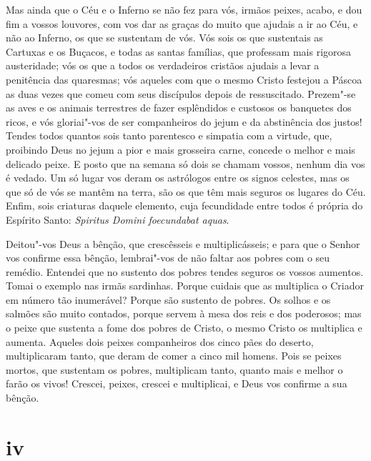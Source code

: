 Mas ainda que o Céu e o Inferno se não fez para vós, irmãos peixes,
acabo, e dou fim a vossos louvores, com vos dar as graças do muito que
ajudais a ir ao Céu, e não ao Inferno, os que se sustentam de vós. Vós
sois os que sustentais as Cartuxas e os Buçacos, e todas as santas
famílias, que professam mais rigorosa austeridade; vós os que a todos os
verdadeiros cristãos ajudais a levar a penitência das quaresmas; vós
aqueles com que o mesmo Cristo festejou a Páscoa as duas vezes que comeu
com seus discípulos depois de ressuscitado. Prezem"-se as aves e os
animais terrestres de fazer esplêndidos e custosos os banquetes dos
ricos, e vós gloriai"-vos de ser companheiros do jejum e da abstinência
dos justos! Tendes todos quantos sois tanto parentesco e simpatia com a
virtude, que, proibindo Deus no jejum a pior e mais grosseira carne,
concede o melhor e mais delicado peixe. E posto que na semana só dois se
chamam vossos, nenhum dia vos é vedado. Um só lugar vos deram os
astrólogos entre os signos celestes, mas os que só de vós se mantêm na
terra, são os que têm mais seguros os lugares do Céu. Enfim, sois
criaturas daquele elemento, cuja fecundidade entre todos é própria do
Espírito Santo: \emph{Spiritus Domini foecundabat aquas}.

Deitou"-vos Deus a bênção, que crescêsseis e multiplicásseis; e para que
o Senhor vos confirme essa bênção, lembrai"-vos de não faltar aos pobres
com o seu remédio. Entendei que no sustento dos pobres tendes seguros os
vossos aumentos. Tomai o exemplo nas irmãs sardinhas. Porque cuidais que
as multiplica o Criador em número tão inumerável? Porque são sustento de
pobres. Os solhos e os salmões são muito contados, porque servem à mesa
dos reis e dos poderosos; mas o peixe que sustenta a fome dos pobres de
Cristo, o mesmo Cristo os multiplica e aumenta. Aqueles dois peixes
companheiros dos cinco pães do deserto, multiplicaram tanto, que deram
de comer a cinco mil homens. Pois se peixes mortos, que sustentam os
pobres, multiplicam tanto, quanto mais e melhor o farão os vivos!
Crescei, peixes, crescei e multiplicai, e Deus vos confirme a sua
bênção.

\section{iv}

